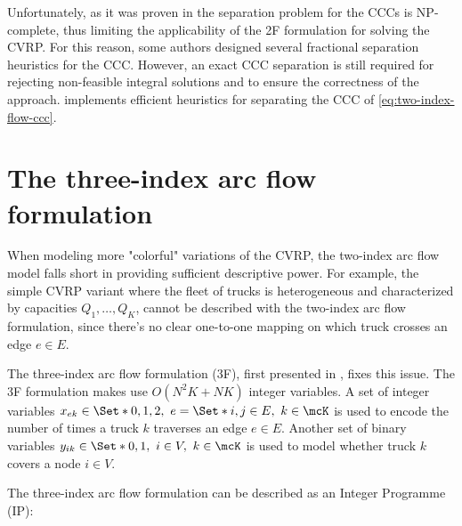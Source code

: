 Unfortunately, as it was proven in \textcite{augerat1995}
the separation problem for the CCCs is NP-complete,
thus limiting the applicability of the 2F formulation for solving the CVRP.
For this reason, some authors \parencite{augerat1995, augerat1998, ralphs2003} designed
several fractional separation heuristics for the CCC.
However,
an exact CCC separation is still required
for rejecting non-feasible integral solutions
and to ensure the correctness of the approach.
\textcite{lysgaard2003cvrpsep} implements efficient
heuristics for separating the CCC of \cref{eq:two-index-flow-ccc}.

\section{The three-index arc flow formulation}
\label{sec:cvrp-three-index-flow-formulation}

When modeling more "colorful" variations of the CVRP,
the two-index arc flow model falls short in providing sufficient descriptive power.
For example,
the simple CVRP variant where the fleet of trucks is heterogeneous
and characterized by capacities $Q_1, \dots, Q_K$,
cannot be described with the two-index arc flow formulation,
since there's no clear one-to-one mapping on which truck crosses an edge $e \in E$.

The three-index arc flow formulation (3F),
first presented in \textcite{golden1977},
fixes this issue.
The 3F formulation makes use $O(N^2 K + N K)$ integer variables.
A set of integer variables $x_{ek} \in \Set*{0, 1, 2},\ e = \Set*{i, j} \in E,\ k \in \mcK$
is used to encode the number of times a truck $k$ traverses an edge $e \in E$.
Another set of binary variables $y_{ik} \in \Set*{0, 1},\ i \in V,\ k \in \mcK$
is used to model whether truck $k$ covers a node $i \in V$.

The three-index arc flow formulation can be described as an Integer Programme (IP):

